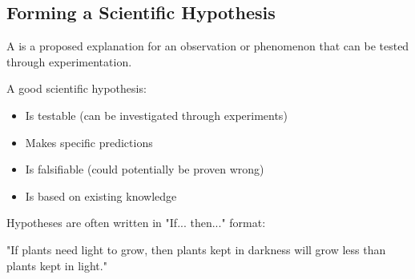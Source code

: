 
\subsection{Forming a Scientific Hypothesis}

A  is a proposed explanation for an observation or phenomenon that can be tested through experimentation.

A good scientific hypothesis:
\begin{itemize}
    \item Is testable (can be investigated through experiments)
    \item Makes specific predictions
    \item Is falsifiable (could potentially be proven wrong)
    \item Is based on existing knowledge
\end{itemize}

Hypotheses are often written in "If... then..." format:

\begin{example}
"If plants need light to grow, then plants kept in darkness will grow less than plants kept in light."
\end{example}


